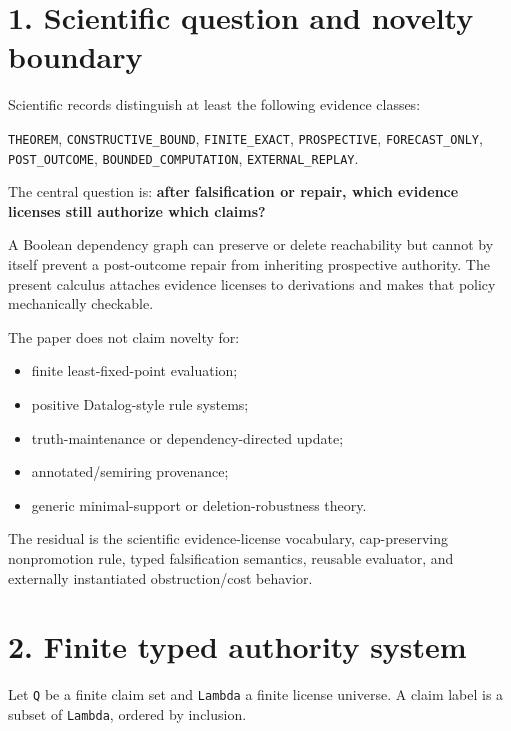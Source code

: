\documentclass[11pt]{article}
\begin{document}
\hypertarget{scientific-question-and-novelty-boundary}{%
\section{1. Scientific question and novelty
boundary}\label{scientific-question-and-novelty-boundary}}

Scientific records distinguish at least the following evidence classes:

\texttt{THEOREM}, \texttt{CONSTRUCTIVE\_BOUND}, \texttt{FINITE\_EXACT},
\texttt{PROSPECTIVE}, \texttt{FORECAST\_ONLY}, \texttt{POST\_OUTCOME},
\texttt{BOUNDED\_COMPUTATION}, \texttt{EXTERNAL\_REPLAY}.

The central question is: \textbf{after falsification or repair, which
evidence licenses still authorize which claims?}

A Boolean dependency graph can preserve or delete reachability but
cannot by itself prevent a post-outcome repair from inheriting
prospective authority. The present calculus attaches evidence licenses
to derivations and makes that policy mechanically checkable.

The paper does not claim novelty for:

\begin{itemize}
\item
  finite least-fixed-point evaluation;
\item
  positive Datalog-style rule systems;
\item
  truth-maintenance or dependency-directed update;
\item
  annotated/semiring provenance;
\item
  generic minimal-support or deletion-robustness theory.
\end{itemize}

The residual is the scientific evidence-license vocabulary,
cap-preserving nonpromotion rule, typed falsification semantics,
reusable evaluator, and externally instantiated obstruction/cost
behavior.

\hypertarget{finite-typed-authority-system}{%
\section{2. Finite typed authority
system}\label{finite-typed-authority-system}}

Let \texttt{Q} be a finite claim set and \texttt{Lambda} a finite
license universe. A claim label is a subset of \texttt{Lambda}, ordered
by inclusion.
\end{document}
